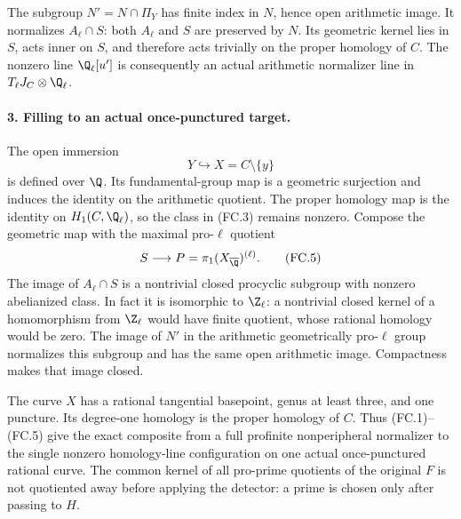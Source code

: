 The subgroup $N'=N\cap\Pi_Y$ has finite index in
$N$, hence open arithmetic image. It normalizes
$A_\ell\cap S$: both $A_\ell$ and $S$ are preserved
by $N$. Its geometric kernel lies in $S$, acts
inner on $S$, and therefore acts trivially on
the proper homology of $C$. The nonzero line
$\Q_\ell[u']$ is consequently an actual
arithmetic normalizer line in $T_\ell J_C\otimes\Q_\ell$.

\paragraph{3. Filling to an actual once-punctured target.}
The open immersion
\[
                         Y\hookrightarrow X=C\setminus\{y\}
                                                               \tag{FC.4}
\]
is defined over $\Q$. Its fundamental-group map
is a geometric surjection and induces the
identity on the arithmetic quotient. The
proper homology map is the identity on
$H_1(C,\Q_\ell)$, so the class in (FC.3)
remains nonzero. Compose the geometric map
with the maximal pro-$\ell$ quotient
\[
                     S\longrightarrow
                     P=\pi_1(X_{\overline\Q})^{(\ell)}.
                                                               \tag{FC.5}
\]
The image of $A_\ell\cap S$ is a nontrivial
closed procyclic subgroup with nonzero
abelianized class. In fact it is isomorphic
to $\Z_\ell$: a nontrivial closed kernel of
a homomorphism from $\Z_\ell$ would have
finite quotient, whose rational homology
would be zero. The image of $N'$ in the
arithmetic geometrically pro-$\ell$ group
normalizes this subgroup and has the same
open arithmetic image. Compactness makes
that image closed.

The curve $X$ has a rational tangential
basepoint, genus at least three, and one
puncture. Its degree-one homology is the
proper homology of $C$. Thus (FC.1)--(FC.5)
give the exact composite from a full
profinite nonperipheral normalizer to the
single nonzero homology-line configuration
on one actual once-punctured rational curve.
The common kernel of all pro-prime quotients
of the original $F$ is not quotiented away
before applying the detector: a prime is
chosen only after passing to $H$.

